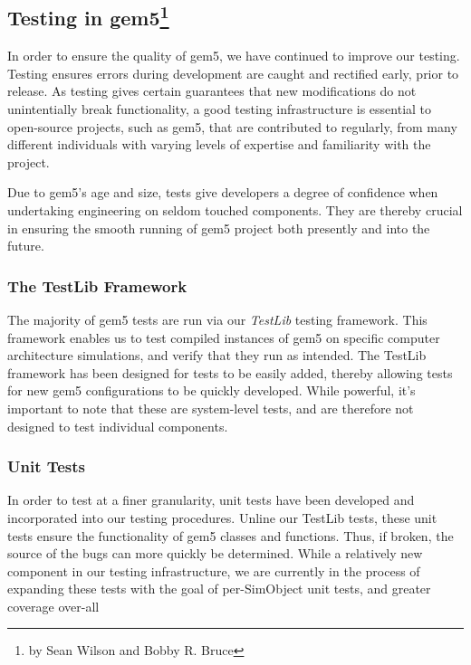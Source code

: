 \subsection[Testing in gem5]{Testing in gem5\footnote{by Sean Wilson and Bobby R. Bruce}}
\label{sec:testing}

In order to ensure the quality of gem5, we have continued to improve our
testing. Testing ensures errors during development are caught and rectified
early, prior to release. As testing gives certain guarantees that new
modifications do not unintentially break functionality, a good testing
infrastructure is essential to open-source projects, such as gem5, that are
contributed to regularly, from many different individuals with varying levels
of expertise and familiarity with the project.

Due to gem5's age and size, tests give developers a degree of confidence when
undertaking engineering on seldom touched components. They are thereby crucial
in ensuring the smooth running of gem5 project both presently and into the
future.

\subsubsection{The TestLib Framework}

The majority of gem5 tests are run via our \emph{TestLib} testing framework.
This framework enables us to test compiled instances of gem5 on specific
computer architecture simulations, and verify that they run as intended. The
TestLib framework has been designed for tests to be easily added, thereby
allowing tests for new gem5 configurations to be quickly developed. While
powerful, it's important to note that these are system-level tests, and are
therefore not designed to test individual components.

\subsubsection{Unit Tests}

In order to test at a finer granularity, unit tests have been developed and
incorporated into our testing procedures. Unline our TestLib tests, these unit
tests ensure the functionality of gem5 classes and functions. Thus, if broken,
the source of the bugs can more quickly be determined. While a relatively new
component in our testing infrastructure, we are currently in the process of
expanding these tests with the goal of per-SimObject unit tests, and greater
coverage over-all

